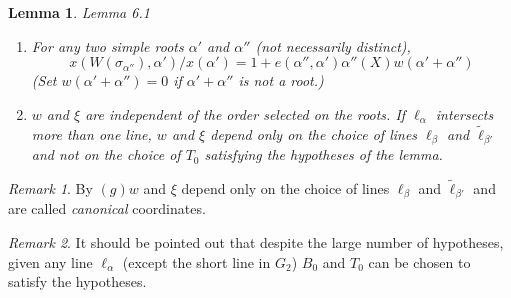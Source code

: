 \documentclass{memo-l}
\newtheorem{lemma}[theorem]{Lemma}
\theoremstyle{definition}
\theoremstyle{remark}
\newtheorem{rem}{Remark}
\numberwithin{section}{chapter}
\numberwithin{equation}{chapter}
\begin{document}
\begin{lemma}{Lemma 6.1}
\begin{enumerate}[label=\alph*)]
\item 
For any two simple roots ${\alpha}'$ and ${\alpha}''$ (not necessarily
distinct), $$x(W({\sigma}_{{\alpha}''}),{\alpha}')/x({\alpha}') =
1+e({\alpha''},{\alpha}'){\alpha}''(X)w({\alpha}'+{\alpha}'')$$ (Set
$w({\alpha}'+{\alpha}'') = 0$ if ${\alpha}'+{\alpha}''$ is not a root.)

\item   
$w$ and ${\xi}$ are independent of the order selected on the roots.  If
${\ell}_{{\alpha}}$ intersects more than one line, $w$ and ${\xi}$ depend
only on the choice of lines ${\ell}_{{\beta}}$ and $\tilde{\ell}
_{{\beta}'}$ and not on the choice of $T_{0}$ satisfying the hypotheses of
the lemma.
\end{enumerate}
\end{lemma}

\begin{rem}  %
By $(g) w$ and ${\xi}$ depend only on the choice of
lines ${\ell}_{{\beta}}$ and $\tilde{\ell} _{{\beta}'}$ and are called
{\it canonical} coordinates.
\end{rem}

\begin{rem} %
It should be pointed out that despite the large
number of hypotheses, given any line ${\ell}_{{\alpha}}$ (except the short
line in $G_{2}$) $B_{0}$ and $T_{0}$ can be chosen to satisfy the hypotheses.
\end{rem}
\end{document}
